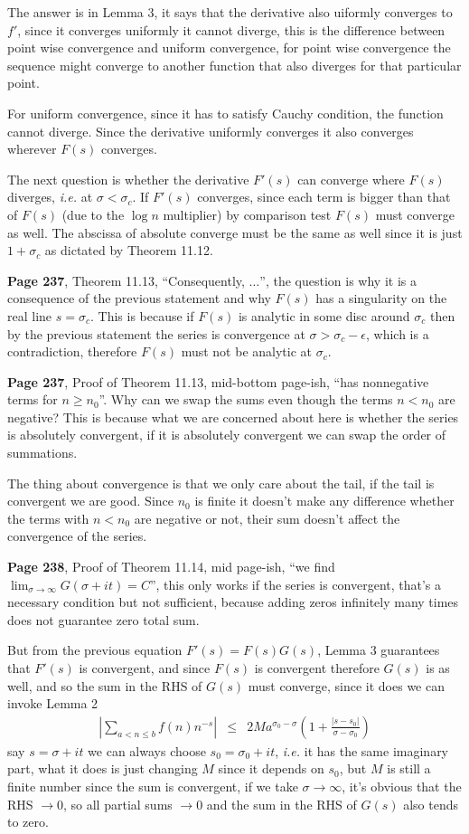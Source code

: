 \documentclass[aps,preprint,preprintnumbers,nofootinbib,showpacs,prd]{revtex4-1}
\newcommand{\ie}{{\it i.e.} }
\newcommand{\nbea}{\begin{eqnarray*}}
\newcommand{\neea}{\end{eqnarray*}}
\begin{document}
The answer is in Lemma 3, it says that the derivative also uiformly converges to $f'$, since it converges uniformly it cannot diverge, this is the difference between point wise convergence and uniform convergence, for point wise convergence the sequence might converge to another function that also diverges for that particular point.

For uniform convergence, since it has to satisfy Cauchy condition, the function cannot diverge. Since the derivative uniformly converges it also converges wherever $F(s)$ converges.

The next question is whether the derivative $F'(s)$ can converge where $F(s)$ diverges, \ie at $\sigma < \sigma_c$. If $F'(s)$ converges, since each term is bigger than that of $F(s)$ (due to the $\log n$ multiplier) by comparison test $F(s)$ must converge as well. The abscissa of absolute converge must be the same as well since it is just $1 + \sigma_c$ as dictated by Theorem 11.12.

{\bf Page 237}, Theorem 11.13, ``Consequently, $\dots$'', the question is why it is a consequence of the previous statement and why $F(s)$ has a singularity on the real line $s = \sigma_c$. This is because if $F(s)$ is analytic in some disc around $\sigma_c$ then by the previous statement the series is convergence at $\sigma > \sigma_c - \epsilon$, which is a contradiction, therefore $F(s)$ must not be analytic at $\sigma_c$.

{\bf Page 237}, Proof of Theorem 11.13, mid-bottom page-ish, ``has nonnegative terms for $n \ge n_0$''. Why can we swap the sums even though the terms $n < n_0$ are negative? This is because what we are concerned about here is whether the series is absolutely convergent, if it is absolutely convergent we can swap the order of summations.

The thing about convergence is that we only care about the tail, if the tail is convergent we are good. Since $n_0$ is finite it doesn't make any difference whether the terms with $n < n_0$ are negative or not, their sum doesn't affect the convergence of the series.

{\bf Page 238}, Proof of Theorem 11.14, mid page-ish, ``we find $\lim_{\sigma\to\infty} G(\sigma + it) = C$'', this only works if the series is convergent, that's a necessary condition but not sufficient, because adding zeros infinitely many times does not guarantee zero total sum.

But from the previous equation $F'(s) = F(s) G(s)$, Lemma 3 guarantees that $F'(s)$ is convergent, and since $F(s)$ is convergent therefore $G(s)$ is as well, and so the sum in the RHS of $G(s)$ must converge, since it does we can invoke Lemma 2
%
\nbea
\left | \sum_{a < n \le b} f(n) n^{-s} \right | & \le & 2Ma^{\sigma_0 - \sigma} \left ( 1 + \frac{|s - s_0|}{\sigma - \sigma_0} \right )
\neea
%
say $s = \sigma + it$ we can always choose $s_0 = \sigma_0 + it$, \ie it has the same imaginary part, what it does is just changing $M$ since it depends on $s_0$, but $M$ is still a finite number since the sum is convergent, if we take $\sigma\to\infty$, it's obvious that the RHS $\to 0$, so all partial sums $\to 0$ and the sum in the RHS of $G(s)$ also tends to zero.
\end{document}
